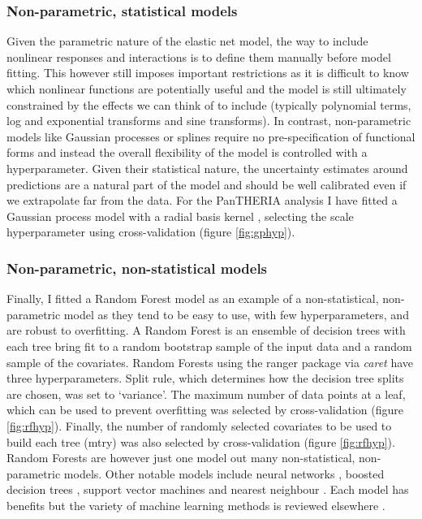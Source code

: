 \documentclass[10pt,]{article}
\begin{document}
\subsubsection{Non-parametric, statistical models}\label{non-parametric-statistical-models}

Given the parametric nature of the elastic net model, the way to include nonlinear responses and interactions is to define them manually before model fitting. This however still imposes important restrictions as it is difficult to know which nonlinear functions are potentially useful and the model is still ultimately constrained by the effects we can think of to include (typically polynomial terms, log and exponential transforms and sine transforms). In contrast, non-parametric models like Gaussian processes \citep{rasmussen2004gaussian} or splines \citep{splines} require no pre-specification of functional forms and instead the overall flexibility of the model is controlled with a hyperparameter. Given their statistical nature, the uncertainty estimates around predictions are a natural part of the model and should be well calibrated even if we extrapolate far from the data. For the PanTHERIA analysis I have fitted a Gaussian process model with a radial basis kernel \citep{kernlab}, selecting the scale hyperparameter using cross-validation (figure \ref{fig:gphyp}).

\subsubsection{Non-parametric, non-statistical models}\label{non-parametric-non-statistical-models}

Finally, I fitted a Random Forest model \citep{breiman2001random, wright2015ranger} as an example of a non-statistical, non-parametric model as they tend to be easy to use, with few hyperparameters, and are robust to overfitting. A Random Forest is an ensemble of decision trees with each tree bring fit to a random bootstrap sample of the input data and a random sample of the covariates. Random Forests using the ranger \citep{wright2015ranger} package via \emph{caret} have three hyperparameters. Split rule, which determines how the decision tree splits are chosen, was set to `variance'. The maximum number of data points at a leaf, which can be used to prevent overfitting was selected by cross-validation (figure \ref{fig:rfhyp}). Finally, the number of randomly selected covariates to be used to build each tree (mtry) was also selected by cross-validation (figure \ref{fig:rfhyp}). Random Forests are however just one model out many non-statistical, non-parametric models. Other notable models include neural networks \citep{neuralnets}, boosted decision trees \citep{friedman2001greedy}, support vector machines \citep{svm} and nearest neighbour \citep{altman1992introduction}. Each model has benefits but the variety of machine learning methods is reviewed elsewhere \citep{crisci2012review}.
\end{document}
